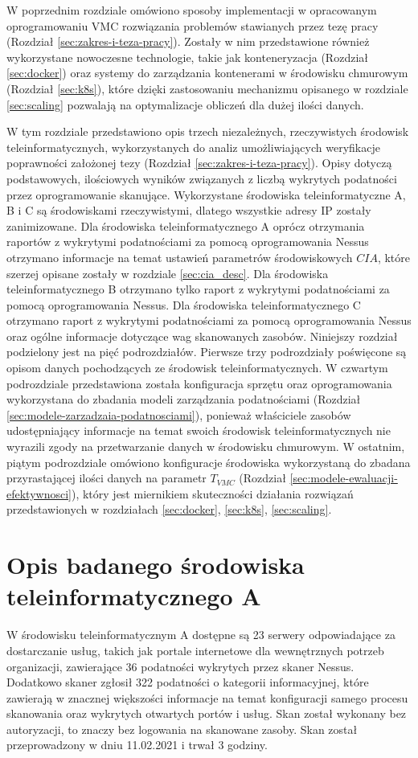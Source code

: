 \label{sec:desc_env_all}
W poprzednim rozdziale omówiono sposoby implementacji w opracowanym oprogramowaniu VMC rozwiązania problemów stawianych przez tezę pracy (Rozdział \ref{sec:zakres-i-teza-pracy}). Zostały w nim przedstawione również wykorzystane nowoczesne technologie, takie jak konteneryzacja (Rozdział \ref{sec:docker}) oraz systemy do zarządzania kontenerami w środowisku chmurowym (Rozdział \ref{sec:k8s}), które dzięki zastosowaniu mechanizmu opisanego w rozdziale \ref{sec:scaling} pozwalają na optymalizacje obliczeń dla dużej ilości danych.

\bigbreak
W tym rozdziale przedstawiono opis trzech niezależnych, rzeczywistych środowisk teleinformatycznych, wykorzystanych do analiz umożliwiających weryfikacje poprawności założonej tezy (Rozdział \ref{sec:zakres-i-teza-pracy}). 
Opisy dotyczą podstawowych, ilościowych wyników związanych z liczbą wykrytych podatności przez oprogramowanie skanujące. Wykorzystane środowiska teleinformatyczne A, B i C są środowiskami rzeczywistymi, dlatego wszystkie adresy IP zostały zanimizowane. Dla środowiska teleinformatycznego A oprócz otrzymania raportów z wykrytymi podatnościami za pomocą oprogramowania Nessus \cite{beale2004nessus} otrzymano informacje na temat ustawień parametrów środowiskowych $CIA$, które szerzej opisane zostały w rozdziale \ref{sec:cia_desc}. Dla środowiska teleinformatycznego B otrzymano tylko raport z wykrytymi podatnościami za pomocą oprogramowania Nessus. Dla środowiska teleinformatycznego C otrzymano raport z wykrytymi podatnościami za pomocą oprogramowania Nessus oraz ogólne informacje dotyczące wag skanowanych zasobów. Niniejszy rozdział podzielony jest na pięć podrozdziałów. Pierwsze trzy podrozdziały poświęcone są opisom danych pochodzących ze środowisk teleinformatycznych. W czwartym podrozdziale przedstawiona została konfiguracja sprzętu oraz oprogramowania wykorzystana do zbadania modeli zarządzania podatnościami (Rozdział \ref{sec:modele-zarzadzaia-podatnosciami}), ponieważ właściciele zasobów udostępniający informacje na temat swoich środowisk teleinformatycznych nie wyrazili zgody na przetwarzanie danych w środowisku chmurowym. W ostatnim, piątym podrozdziale omówiono konfiguracje środowiska wykorzystaną do zbadana przyrastającej ilości danych na parametr $T_{VMC}$ (Rozdział \ref{sec:modele-ewaluacji-efektywnosci}), który jest miernikiem skuteczności działania rozwiązań przedstawionych w rozdziałach \ref{sec:docker}, \ref{sec:k8s}, \ref{sec:scaling}.

\section{Opis badanego środowiska teleinformatycznego A}
\label{sec:desc_a}
W środowisku teleinformatycznym A dostępne są 23 serwery odpowiadające za dostarczanie usług, takich jak portale internetowe dla wewnętrznych potrzeb organizacji, zawierające 36 podatności wykrytych przez skaner Nessus. Dodatkowo skaner zgłosił 322 podatności o kategorii informacyjnej, które zawierają w znacznej większości informacje na temat konfiguracji samego procesu skanowania oraz wykrytych otwartych portów i usług. Skan został wykonany bez autoryzacji, to znaczy bez logowania na skanowane zasoby. Skan został przeprowadzony w dniu 11.02.2021 i trwał 3 godziny.


